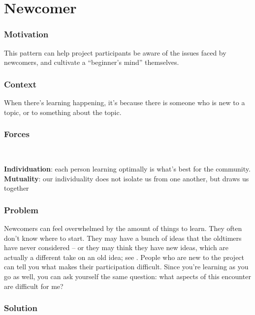 

\section{Newcomer}\label{sec:Newcomer}

\subsubsection*{Motivation} This pattern can help project participants be aware of the issues faced by newcomers, and cultivate a ``beginner's mind'' themselves.

\subsubsection*{Context}
When there's learning happening, it's because there is someone who is new to a topic, or to something about the topic.

\subsubsection*{Forces}~
\parbox[t]{.85\textwidth}{
\textbf{Individuation}: each person learning optimally is what's best for the community.\\
\textbf{Mutuality}: our individuality does not isolate us from one another, but draws us together
}

\subsubsection*{Problem} Newcomers can feel overwhelmed by the amount of things to learn.  They
often don't know where to start.  They may have a bunch of ideas that the
oldtimers have never considered -- or they may think they have new
ideas, which are actually a different take on an old idea; see
. People who are new to the project can tell you what makes their participation difficult.  Since you're learning as you go as well, you can ask yourself the same question: what aspects of this encounter are difficult for me?  

\subsubsection*{Solution}


